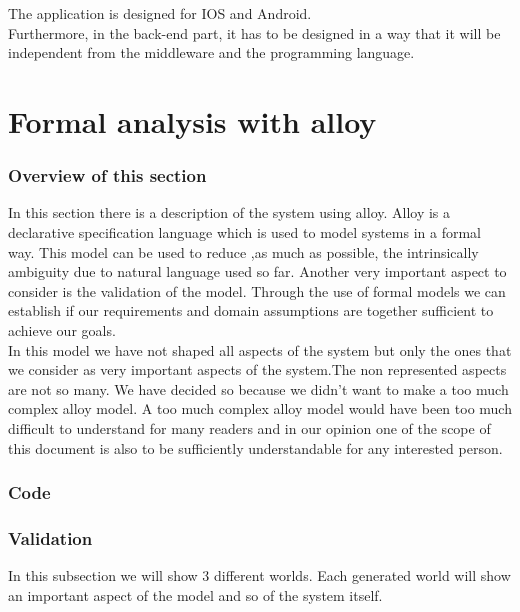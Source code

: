 \documentclass[titlepage]{article}
\begin{document}
The application is designed for IOS and Android.\\

Furthermore, in the back-end part, it has to be designed in a way that it will be independent from the middleware and the programming language.


\section{Formal analysis with alloy}
\subsubsection{Overview of this section}
In this section there is a description of the system using alloy. Alloy is a declarative specification language which is used to model systems in a formal way. This model can be used to reduce ,as much as possible, the intrinsically ambiguity due to natural language used so far.
Another very important aspect to consider is the validation of the model. Through the use of formal models we can establish if our requirements and domain assumptions are together sufficient to achieve our goals.\\
In this model we have not shaped all aspects of the system but only the ones that we consider as very important aspects of the system.The non represented aspects are not so many. We have decided so because we didn't want to make a too much complex alloy model. A too much complex alloy model would have been too much difficult to understand for many readers and in our opinion one of the scope of this document is also to be sufficiently understandable for any interested person.

\subsubsection{Code}

\subsubsection{Validation}
In this subsection we will show 3 different worlds. Each generated world will show an important aspect of the model and so of the system itself.
\end{document}
